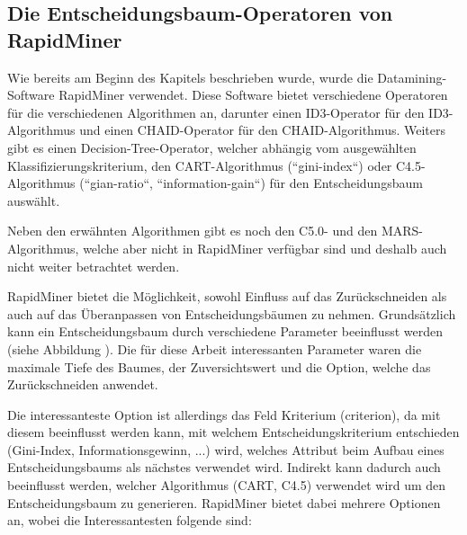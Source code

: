 \subsection{Die Entscheidungsbaum-Operatoren von RapidMiner}
\label{entschiedungskriterienRapidMiner}
Wie bereits am Beginn des Kapitels beschrieben wurde, wurde die Datamining-Software RapidMiner verwendet. Diese Software bietet verschiedene Operatoren für die verschiedenen Algorithmen an, darunter einen ID3-Operator für den ID3-Algorithmus und einen CHAID-Operator für den CHAID-Algorithmus. Weiters gibt es einen Decision-Tree-Operator, welcher abhängig vom ausgewählten Klassifizierungskriterium, den CART-Algorithmus (``gini-index``)  oder C4.5-Algorithmus (``gian-ratio``, ``information-gain``) für den Entscheidungsbaum auswählt. \cite{rapidminer_rapidminer_2015} 

Neben den erwähnten Algorithmen gibt es noch den C5.0- und den MARS-Algorithmus, welche aber nicht in RapidMiner verfügbar sind und deshalb auch nicht weiter betrachtet werden.

RapidMiner bietet die Möglichkeit, sowohl Einfluss auf das Zurückschneiden als auch auf das Überanpassen von Entscheidungsbäumen zu nehmen. Grundsätzlich kann ein Entscheidungsbaum durch  verschiedene Parameter beeinflusst werden (siehe Abbildung ). Die für diese Arbeit interessanten Parameter waren die maximale Tiefe des Baumes, der Zuversichtswert und die Option, welche das Zurückschneiden anwendet.

Die interessanteste Option ist allerdings das Feld Kriterium (criterion), da mit diesem beeinflusst werden kann, mit welchem Entscheidungskriterium entschieden (Gini-Index, Informationsgewinn, ...) wird, welches Attribut beim Aufbau eines Entscheidungsbaums als nächstes verwendet wird. Indirekt kann dadurch auch beeinflusst werden, welcher Algorithmus (CART, C4.5) verwendet wird um den Entscheidungsbaum zu generieren. RapidMiner bietet dabei mehrere Optionen an, wobei die Interessantesten folgende sind:

